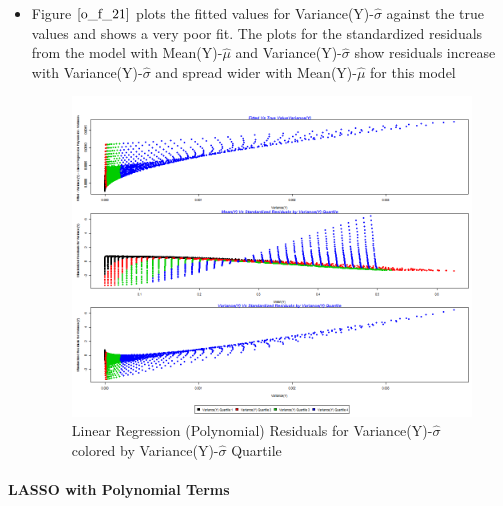\documentclass[twoside,12pt]{article}
\begin{document}
\begin{itemize}
\begin{verbatim}
\end{verbatim}

\FloatBarrier
\item
Figure $\eqref{o_f_21}$ plots the fitted values for Variance(Y)-$\hat{\sigma}$ against the true values and shows a very poor fit.  The plots for the standardized residuals from the model with Mean(Y)-$\hat{\mu}$ and Variance(Y)-$\hat{\sigma}$ show residuals increase with Variance(Y)-$\hat{\sigma}$ and spread wider with Mean(Y)-$\hat{\mu}$ for this model
\FloatBarrier
\begin{figure}[!htbp]
\centering
\includegraphics[scale=.50]{images/mt_rse_plot_var_v_trg_lg_poly.png} 
\caption{Linear Regression (Polynomial) Residuals for Variance(Y)-$\hat{\sigma}$  colored by Variance(Y)-$\hat{\sigma}$  Quartile}
\label{o_f_21}
\end{figure}

\end{itemize}


\FloatBarrier
\paragraph{LASSO with Polynomial Terms}
\end{document}

